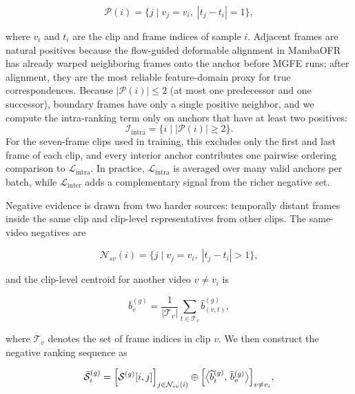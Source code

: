 \documentclass[symmetry,article,submit,pdftex,moreauthors]{Definitions/mdpi}
\begin{document}
\begin{equation}
\mathcal{P}(i)=
\bigl\{
j \mid v_j=v_i,\;
|t_j-t_i|=1
\bigr\},
\end{equation}

where $v_i$ and $t_i$ are the clip and frame indices of sample $i$. Adjacent frames are natural positives because the flow-guided deformable alignment in MambaOFR has already warped neighboring frames onto the anchor before MGFE runs; after alignment, they are the most reliable feature-domain proxy for true correspondences. Because $|\mathcal{P}(i)| \le 2$ (at most one predecessor and one successor), boundary frames have only a single positive neighbor, and we compute the intra-ranking term only on anchors that have at least two positives:
\begin{equation}
\mathcal{I}_{\text{intra}}=
\bigl\{
i \mid |\mathcal{P}(i)| \ge 2
\bigr\}.
\end{equation}
For the seven-frame clips used in training, this excludes only the first and last frame of each clip, and every interior anchor contributes one pairwise ordering comparison to $\mathcal{L}_{\text{intra}}$. In practice, $\mathcal{L}_{\text{intra}}$ is averaged over many valid anchors per batch, while $\mathcal{L}_{\text{inter}}$ adds a complementary signal from the richer negative set.

Negative evidence is drawn from two harder sources: temporally distant frames inside the same clip and clip-level representatives from other clips. The same-video negatives are

\begin{equation}
\mathcal{N}_{sv}(i)=
\bigl\{
j \mid v_j=v_i,\;
|t_j-t_i|>1
\bigr\},
\end{equation}

and the clip-level centroid for another video $v\neq v_i$ is

\begin{equation}
\bar{b}_{v}^{(g)} =
\frac{1}{|\mathcal{T}_v|}
\sum_{t\in\mathcal{T}_v}
\widehat{b}_{(v,t)}^{(g)},
\end{equation}

where $\mathcal{T}_v$ denotes the set of frame indices in clip $v$. We then construct the negative ranking sequence as

\begin{equation}
\bar{\mathcal{S}}_i^{(g)} =
\Bigl[\mathcal{S}^{(g)}[i,j]\Bigr]_{j\in\mathcal{N}_{sv}(i)}
\oplus
\Bigl[\bigl\langle \widehat{b}_i^{(g)},\,\bar{b}_v^{(g)} \bigr\rangle\Bigr]_{v\neq v_i},
\end{equation}
\end{document}
